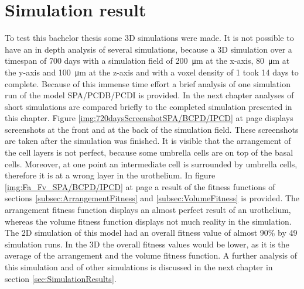 \section{Simulation result}
To test this bachelor thesis some 3D simulations were made. It is not possible to have an in depth analysis of several simulations, because a 3D simulation over a timespan of 700 days with a simulation field of \SI{200}{\micro\metre} at the x-axis, \SI{80}{\micro\metre} at the y-axis and \SI{100}{\micro\metre} at the z-axis and with a voxel density of 1 took 14 days to complete. Because of this immense time effort a brief analysis of one simulation run of the model SPA/PCDB/PCDI is provided. In the next chapter analyses of short simulations are compared briefly to the completed simulation presented in this chapter. \newline
Figure \ref{img:720daysScreenshotSPA/BCPD/IPCD} at page \pageref{img:720daysScreenshotSPA/BCPD/IPCD} displays screenshots at the front and at the back of the simulation field. These screenshots are taken after the simulation was finished. It is visible that the arrangement of the cell layers is not perfect, because some umbrella cells are on top of the basal cells. Moreover, at one point an intermediate cell is surrounded by umbrella cells, therefore it is at a wrong layer in the urothelium. \newline
In figure \ref{img:Fa_Fv_SPA/BCPD/IPCD} at page \pageref{img:Fa_Fv_SPA/BCPD/IPCD} a result of the fitness functions of sections \ref{subsec:ArrangementFitness} and \ref{subsec:VolumeFitness} is provided. The arrangement fitness function displays an almost perfect result of an urothelium, whereas the volume fitness function displays not much reality in the simulation. The 2D simulation of this model had an overall fitness value of almost 90\% by 49 simulation runs. In the 3D the overall fitness values would be lower, as it is the average of the arrangement and the volume fitness function.
A further analysis of this simulation and of other simulations is discussed in the next chapter in section \ref{sec:SimulationResults}.

